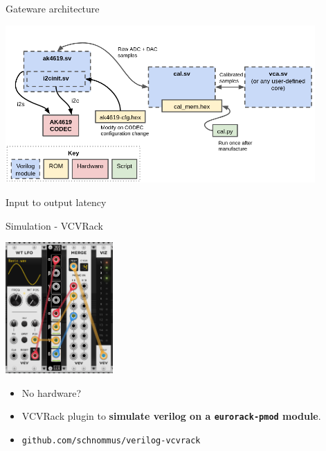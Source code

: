 \documentclass{beamer}
\begin{document}
\begin{frame}{Gateware architecture}

    \begin{center}
        \includegraphics[height=6cm]{img/gateware-arch.png}
    \end{center}

\end{frame}

\begin{frame}{Input to output latency}


\end{frame}

\begin{frame}{Simulation - VCVRack}

    \begin{center}
        \includegraphics[height=5cm]{img/vcvrack.png}
    \end{center}

    \begin{itemize}
        \item No hardware?
        \item VCVRack plugin to \textbf{simulate verilog on a \texttt{eurorack-pmod} module}.
        \item \texttt{github.com/schnommus/verilog-vcvrack}
    \end{itemize}

\end{frame}
\end{document}
